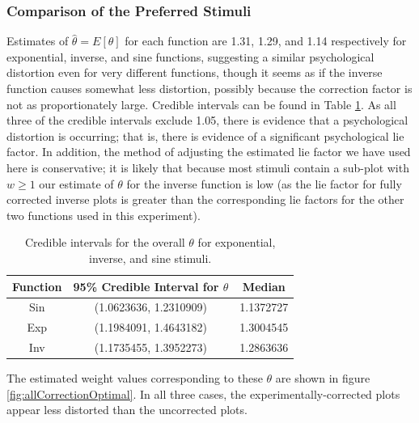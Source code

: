 \documentclass[11pt]{isuthesis}\usepackage[]{graphicx}\usepackage[]{color}
\begin{document}
\subsubsection*{Comparison of the Preferred Stimuli}
Estimates of $\hat\theta = E[\theta]$ for each function are 1.31, 1.29, and 1.14 respectively for exponential, inverse, and sine functions, suggesting a similar psychological distortion even for very different functions, though it seems as if the inverse function causes somewhat less distortion, possibly because the correction factor is not as proportionately large. Credible intervals can be found in Table \ref{tab:credibleintervalstable}. As all three of the credible intervals exclude 1.05, there is evidence that a psychological distortion is occurring; that is, there is evidence of a significant psychological lie factor. In addition, the method of adjusting the estimated lie factor we have used here is conservative; it is likely that because most stimuli contain a sub-plot with $w\geq 1$ our estimate of $\theta$ for the inverse function is low (as the lie factor for fully corrected inverse plots is greater than the corresponding lie factors for the other two functions used in this experiment). 

\begin{table}[tp]\centering
\caption[Credible intervals for overall psychological lie factor]{Credible intervals for the overall $\theta$ for exponential, inverse, and sine stimuli.\label{tab:credibleintervalstable}}\begin{tabular}{ccc}\hline
Function & 95\% Credible Interval for $\theta$ & Median\\\hline
Sin & (1.0623636, 1.2310909) & 1.1372727\\
Exp & (1.1984091, 1.4643182) & 1.3004545\\
Inv & (1.1735455, 1.3952273) & 1.2863636\\
\hline
\end{tabular}
\end{table}

The estimated weight values corresponding to these $\theta$ are shown in figure \ref{fig:allCorrectionOptimal}. In all three cases, the experimentally-corrected plots appear less distorted than the uncorrected plots. 
\end{document}
